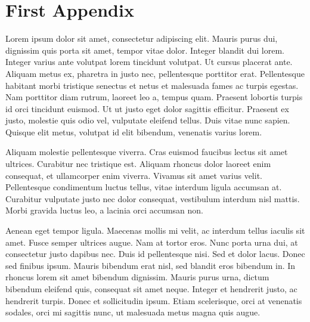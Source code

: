 \documentclass[12pt]{article}
\makeatletter
\newenvironment{appendixenv}[1][\@empty]{\begingroup\appendix}{\endgroup}
\makeatother
\begin{document}
\begin{appendixenv}[Appendix]
    \section{First Appendix} \label{apx:first-appendix}

    Lorem ipsum dolor sit amet, consectetur adipiscing elit. Mauris purus dui, dignissim quis porta sit amet, tempor vitae dolor. Integer blandit dui lorem. Integer varius ante volutpat lorem tincidunt volutpat. Ut cursus placerat ante. Aliquam metus ex, pharetra in justo nec, pellentesque porttitor erat. Pellentesque habitant morbi tristique senectus et netus et malesuada fames ac turpis egestas. Nam porttitor diam rutrum, laoreet leo a, tempus quam. Praesent lobortis turpis id orci tincidunt euismod. Ut ut justo eget dolor sagittis efficitur. Praesent ex justo, molestie quis odio vel, vulputate eleifend tellus. Duis vitae nunc sapien. Quisque elit metus, volutpat id elit bibendum, venenatis varius lorem. 

    Aliquam molestie pellentesque viverra. Cras euismod faucibus lectus sit amet ultrices. Curabitur nec tristique est. Aliquam rhoncus dolor laoreet enim consequat, et ullamcorper enim viverra. Vivamus sit amet varius velit. Pellentesque condimentum luctus tellus, vitae interdum ligula accumsan at. Curabitur vulputate justo nec dolor consequat, vestibulum interdum nisl mattis. Morbi gravida luctus leo, a lacinia orci accumsan non.

    Aenean eget tempor ligula. Maecenas mollis mi velit, ac interdum tellus iaculis sit amet. Fusce semper ultrices augue. Nam at tortor eros. Nunc porta urna dui, at consectetur justo dapibus nec. Duis id pellentesque nisi. Sed et dolor lacus. Donec sed finibus ipsum. Mauris bibendum erat nisl, sed blandit eros bibendum in. In rhoncus lorem sit amet bibendum dignissim. Mauris purus urna, dictum bibendum eleifend quis, consequat sit amet neque. Integer et hendrerit justo, ac hendrerit turpis. Donec et sollicitudin ipsum. Etiam scelerisque, orci at venenatis sodales, orci mi sagittis nunc, ut malesuada metus magna quis augue. 
\end{appendixenv}
\end{document}
